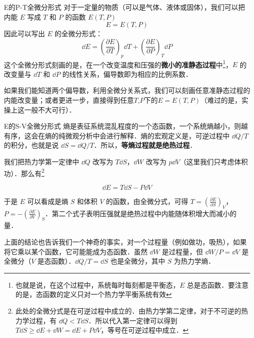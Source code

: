 \begin{example}{E的P-T全微分形式}
对于一定量的物质（可以是气体、液体或固体），我们可以把内能 $E$ 写成 $T$ 和 $P$ 的函数 $E(T,P)$
\begin{equation}
E=E(T,P)
\end{equation}
因此可以写出 $E$ 的全微分形式：
\begin{equation}
\dd E=\left(\frac{\partial E}{\partial T}\right)_p \dd T + \left(\frac{\partial E}{\partial P}\right)_T \dd P
\end{equation}
这个全微分形式刻画的是，在一个改变温度和压强的\textbf{微小的准静态过程}中\footnote{也就是说，在这个过程中，系统每时每刻都是平衡态，$E$ 总是态函数．要注意的是，态函数的定义只对一个热力学平衡系统有效}，$E$ 的改变量与 $\dd T$ 和 $\dd P$ 的线性关系，偏导数即为相应的比例系数．

如果我们能知道两个偏导数，利用全微分关系式，我们可以刻画任意准静态过程的内能改变量；或者更进一步，直接得到任意$T$,$P$下的$E=E(T,P)$（难过的是，实操上这一般不大可行）．
\end{example}

\begin{example}{E的S-V全微分形式}
熵是表征系统混乱程度的一个态函数，一个系统熵越小，则越有序，这会在熵的纯微观分析中会进行解释．熵的宏观定义是，可逆过程中 $\dd Q/T$ 的积分，也就是说 $\dd S=\dd Q/T$．所以，\textbf{等熵过程就是绝热过程}．

我们把热力学第一定律中 $\dd Q$ 改写为 $T\dd S$，$\dd W$ 改写为 $p\dd V$（这里我们只考虑体积功）．那么有\footnote{
此处的全微分式是在可逆过程中成立的．由热力学第二定律，对于不可逆的热力学过程，有 $\dd Q<T\dd S$．所以代入第一定律可以得到 $T\dd S\ge \dd E+\dd W=\dd E+P\dd V$，等号在可逆过程中成立．
}

\begin{equation}
\dd E=T\dd S-P\dd V
\end{equation}

于是 $E$ 可以看成是熵 $S$ 和体积 $V$ 的函数，由全微分式，可得 $T=\left(\frac{\partial E}{\partial S}\right)_V$，$P=-\left(\frac{\partial E}{\partial V}\right)_S$．第二个式子表明压强就是绝热过程中内能随体积增大而减小的量．

上面的结论也告诉我们一个神奇的事实，对一个过程量（例如做功，吸热），如果将它乘以某个函数，它可能能成为态函数．虽然 $\dd W$ 是过程量，但 $\dd W/P=\dd V$ 是全微分（$V$ 是态函数）．$\dd Q/T=\dd S$ 也是全微分，其中 $S$ 为热力学熵．
\end{example}

